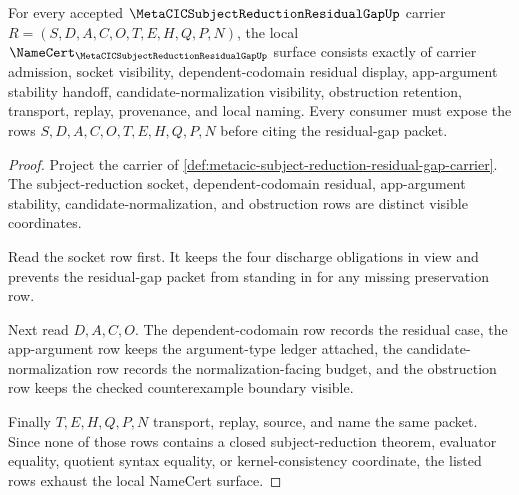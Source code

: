 \begin{theorem}
\label{thm:metacic-subject-reduction-residual-gap-obligations}
For every accepted $\MetaCICSubjectReductionResidualGapUp$ carrier
$R=(S,D,A,C,O,T,E,H,Q,P,N)$, the local
$\NameCert_{\MetaCICSubjectReductionResidualGapUp}$ surface consists exactly
of carrier admission, socket visibility, dependent-codomain residual display,
app-argument stability handoff, candidate-normalization visibility,
obstruction retention, transport, replay, provenance, and local naming. Every
consumer must expose the rows $S,D,A,C,O,T,E,H,Q,P,N$ before citing the
residual-gap packet.
\end{theorem}
\begin{proof}
Project the carrier of
\autoref{def:metacic-subject-reduction-residual-gap-carrier}. The
subject-reduction socket, dependent-codomain residual, app-argument stability,
candidate-normalization, and obstruction rows are distinct visible
coordinates.

Read the socket row first. It keeps the four discharge obligations in view and
prevents the residual-gap packet from standing in for any missing preservation
row.

Next read $D,A,C,O$. The dependent-codomain row records the residual case, the
app-argument row keeps the argument-type ledger attached, the
candidate-normalization row records the normalization-facing budget, and the
obstruction row keeps the checked counterexample boundary visible.

Finally $T,E,H,Q,P,N$ transport, replay, source, and name the same packet.
Since none of those rows contains a closed subject-reduction theorem,
evaluator equality, quotient syntax equality, or kernel-consistency
coordinate, the listed rows exhaust the local NameCert surface.
\end{proof}

